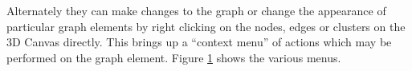 \documentclass[runningheads]{cl2emult}
\begin{document}
Alternately they can make changes to
the graph or change the appearance of particular graph elements by
right
clicking on the nodes, edges or clusters on the 3D Canvas directly.
This brings up a ``context menu'' of actions which may be performed on 
the graph
element.  Figure \ref{fig-popupmenus} shows the various  menus.

\begin{figure}
  \label{fig-popupmenus}
  \subfigure[Edge] {
    \label{fig-edgemenu}
\scalebox{0.3}{
}}
\end{figure}
\end{document}
